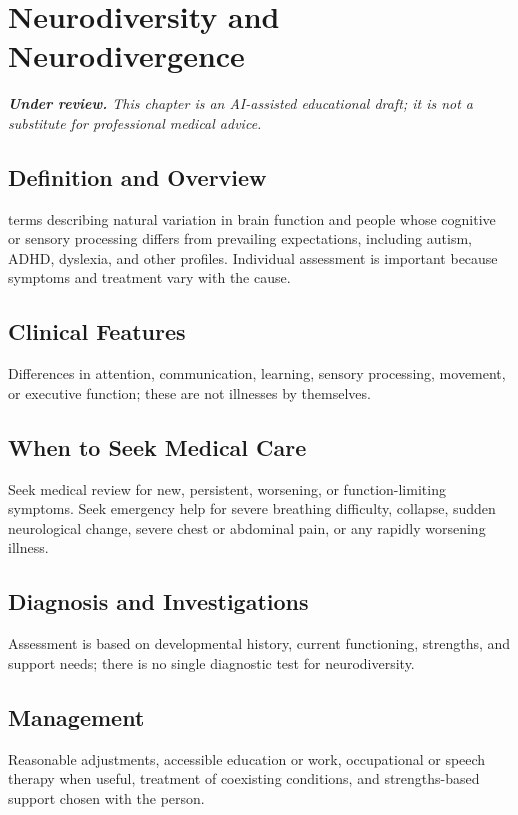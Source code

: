 \chapter{Neurodiversity and Neurodivergence}

\medskip
\noindent\textit{\textbf{Under review.} This chapter is an AI-assisted educational draft; it is not a substitute for professional medical advice.}

\section*{Definition and Overview}
terms describing natural variation in brain function and people whose cognitive or sensory processing differs from prevailing expectations, including autism, ADHD, dyslexia, and other profiles. Individual assessment is important because symptoms and treatment vary with the cause.

\section*{Clinical Features}
Differences in attention, communication, learning, sensory processing, movement, or executive function; these are not illnesses by themselves.

\section*{When to Seek Medical Care}
Seek medical review for new, persistent, worsening, or function-limiting symptoms. Seek emergency help for severe breathing difficulty, collapse, sudden neurological change, severe chest or abdominal pain, or any rapidly worsening illness.

\section*{Diagnosis and Investigations}
Assessment is based on developmental history, current functioning, strengths, and support needs; there is no single diagnostic test for neurodiversity.

\section*{Management}
Reasonable adjustments, accessible education or work, occupational or speech therapy when useful, treatment of coexisting conditions, and strengths-based support chosen with the person.

